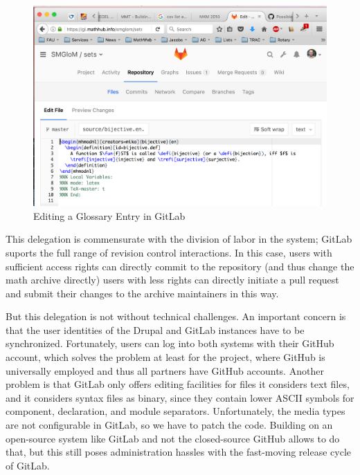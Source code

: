 \begin{figure}[ht]\centering
  \includegraphics[width=\textwidth]{bijective-edit}
  \caption{Editing a Glossary Entry in GitLab}\label{fig:bijective-edit}
\end{figure}

This delegation is commensurate with the division of labor in the \sys system; GitLab
suports the full range of revision control interactions. In this case, users with
sufficient access rights can directly commit to the repository (and thus change the math
archive directly) users with less rights can directly initiate a pull request and submit
their changes to the archive maintainers in this way. 

But this delegation is not without technical challenges. An important concern is that the
user identities of the Drupal and GitLab instances have to be synchronized. Fortunately,
users can log into both systems with their GitHub account, which solves the problem at
least for the \pn project, where GitHub is universally employed and thus all partners
have GitHub accounts. Another problem is that GitLab only offers editing facilities for
files it considers text files, and it considers \mmt syntax files as binary, since they
contain lower ASCII symbols for component, declaration, and module separators.
Unfortunately, the media types are not configurable in GitLab, so we have to patch the
code. Building on an open-source system like GitLab and not the closed-source GitHub
allows to do that, but this still poses administration hassles with the fast-moving
release cycle of GitLab.


